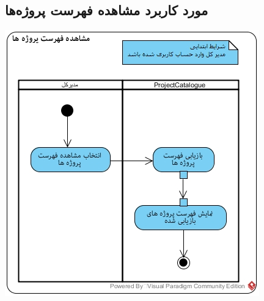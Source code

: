 \subsection*{مورد کاربرد مشاهده فهرست پروژه‌ها}
\vspace{2cm}
\begin{center}
\includegraphics[width=\textwidth]{ActivityDiagramsWithSwimlanes/32.jpg}
\end{center}

\newpage
\vspace{2cm}
